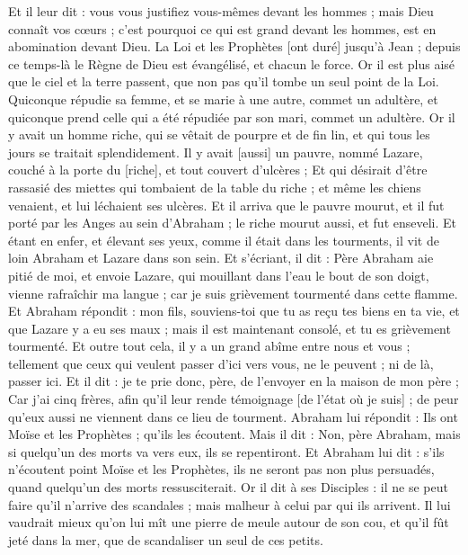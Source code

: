 \begin{multicols}{2}
Et il leur dit : vous vous justifiez vous-mêmes devant les hommes ; mais Dieu connaît vos cœurs ; c'est pourquoi ce qui est grand devant les hommes, est en abomination devant Dieu.
La Loi et les Prophètes [ont duré] jusqu'à Jean ; depuis ce temps-là le Règne de Dieu est évangélisé, et chacun le force.
Or il est plus aisé que le ciel et la terre passent, que non pas qu'il tombe un seul point de la Loi.
Quiconque répudie sa femme, et se marie à une autre, commet un adultère, et quiconque prend celle qui a été répudiée par son mari, commet un adultère.
Or il y avait un homme riche, qui se vêtait de pourpre et de fin lin, et qui tous les jours se traitait splendidement.
Il y avait [aussi] un pauvre, nommé Lazare, couché à la porte du [riche], et tout couvert d'ulcères ;
Et qui désirait d'être rassasié des miettes qui tombaient de la table du riche ; et même les chiens venaient, et lui léchaient ses ulcères.
Et il arriva que le pauvre mourut, et il fut porté par les Anges au sein d'Abraham ; le riche mourut aussi, et fut enseveli.
Et étant en enfer, et élevant ses yeux, comme il était dans les tourments, il vit de loin Abraham et Lazare dans son sein.
Et s'écriant, il dit : Père Abraham aie pitié de moi, et envoie Lazare, qui mouillant dans l'eau le bout de son doigt, vienne rafraîchir ma langue ; car je suis grièvement tourmenté dans cette flamme.
Et Abraham répondit : mon fils, souviens-toi que tu as reçu tes biens en ta vie, et que Lazare y a eu ses maux ; mais il est maintenant consolé, et tu es grièvement tourmenté.
Et outre tout cela, il y a un grand abîme entre nous et vous ; tellement que ceux qui veulent passer d'ici vers vous, ne le peuvent ; ni de là, passer ici.
Et il dit : je te prie donc, père, de l'envoyer en la maison de mon père ;
Car j'ai cinq frères, afin qu'il leur rende témoignage [de l'état où je suis] ; de peur qu'eux aussi ne viennent dans ce lieu de tourment.
Abraham lui répondit : Ils ont Moïse et les Prophètes ; qu'ils les écoutent.
Mais il dit : Non, père Abraham, mais si quelqu'un des morts va vers eux, ils se repentiront.
Et Abraham lui dit : s'ils n'écoutent point Moïse et les Prophètes, ils ne seront pas non plus persuadés, quand quelqu'un des morts ressusciterait.
\VerseOne{}Or il dit à ses Disciples : il ne se peut faire qu'il n'arrive des scandales ; mais malheur à celui par qui ils arrivent.
Il lui vaudrait mieux qu'on lui mît une pierre de meule autour de son cou, et qu'il fût jeté dans la mer, que de scandaliser un seul de ces petits.

\end{multicols}
